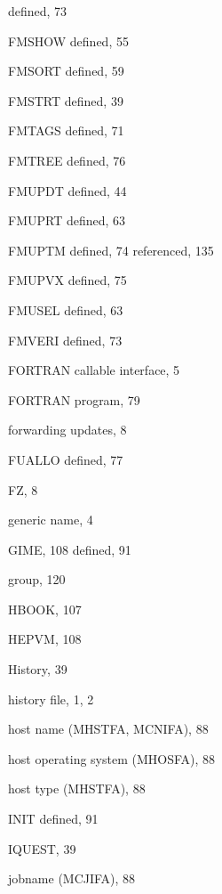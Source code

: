 \begin{theindex}
    \subitem defined, 73
  \item FMSHOW
    \subitem defined, 55
  \item FMSORT
    \subitem defined, 59
  \item FMSTRT
    \subitem defined, 39
  \item FMTAGS
    \subitem defined, 71
  \item FMTREE
    \subitem defined, 76
  \item FMUPDT
    \subitem defined, 44
  \item FMUPRT
    \subitem defined, 63
  \item FMUPTM
    \subitem defined, 74
    \subitem referenced, 135
  \item FMUPVX
    \subitem defined, 75
  \item FMUSEL
    \subitem defined, 63
  \item FMVERI
    \subitem defined, 73
  \item FORTRAN callable interface, 5
  \item FORTRAN program, 79
  \item forwarding updates, 8
  \item FUALLO
    \subitem defined, 77
  \item FZ, 8

  \indexspace

  \item generic name, 4
  \item GIME, 108
    \subitem defined, 91
  \item group, 120

  \indexspace

  \item HBOOK, 107
  \item HEPVM, 108
  \item History, 39
  \item history file, 1, 2
  \item host name (MHSTFA, MCNIFA), 88
  \item host operating system (MHOSFA), 88
  \item host type (MHSTFA), 88

  \indexspace

  \item INIT
    \subitem defined, 91
  \item IQUEST, 39

  \indexspace

  \item jobname (MCJIFA), 88

  \indexspace


\end{theindex}
